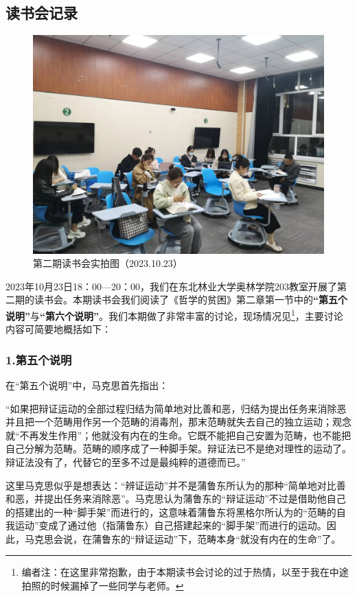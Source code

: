 \documentclass[a4paper,twoside,12pt,AutoFakeBold]{ctexart}
\begin{document}
\subsection{读书会记录}
\begin{figure}[h]
    \centering
    \includegraphics[width=1\linewidth]{10.23.jpg}
    \caption{第二期读书会实拍图（2023.10.23）}
    \label{fig1}
\end{figure}
2023年10月23日18：00—20：00，我们在东北林业大学奥林学院203教室开展了第二期的读书会。本期读书会我们阅读了《哲学的贫困》第二章第一节中的\textbf{“第五个说明”}与\textbf{“第六个说明”}。我们本期做了非常丰富的讨论，现场情况见\textbf{}\footnote{编者注：在这里非常抱歉，由于本期读书会讨论的过于热情，以至于我在中途拍照的时候漏掉了一些同学与老师。}，主要讨论内容可简要地概括如下：
\subsubsection{1.第五个说明}

在“第五个说明”中，马克思首先指出：
\begin{adjustwidth}{2em}{2em}
    \qquad\fangsong
    “如果把辩证运动的全部过程归结为简单地对比善和恶，归结为提出任务来消除恶并且把一个范畴用作另一个范畴的消毒剂，那末范畴就失去自己的独立运动；观念就“不再发生作用”；他就没有内在的生命。它既不能把自己安置为范畴，也不能把自己分解为范畴。范畴的顺序成了一种脚手架。辩证法已不是绝对理性的运动了。辩证法没有了，代替它的至多不过是最纯粹的道德而已。”
\end{adjustwidth}

这里马克思似乎是想表达：“辨证运动”并不是蒲鲁东所认为的那种“简单地对比善和恶，并提出任务来消除恶”。马克思认为蒲鲁东的“辩证运动”不过是借助他自己的搭建出的一种“脚手架”而进行的，这意味着蒲鲁东将黑格尔所认为的“范畴的自我运动”变成了通过他（指蒲鲁东）自己搭建起来的“脚手架”而进行的运动。因此，马克思会说，在蒲鲁东的“辩证运动”下，范畴本身“就没有内在的生命”了。
\end{document}
